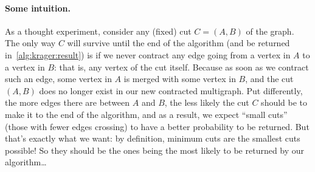 \paragraph{Some intuition.} As a thought experiment, consider any (fixed) cut $C=(A,B)$ of the graph. The only way $C$ will survive until the end of the algorithm (and be returned in~\cref{alg:krager:result}) is if we never contract any edge going from a vertex in $A$ to a vertex in $B$: that is, any vertex of the cut itself. Because as soon as we contract such an edge, some vertex in $A$ is merged with some vertex in $B$, and the cut $(A,B)$ does no longer exist in our new contracted multigraph. Put differently, the more edges there are between $A$ and $B$, the less likely the cut $C$ should be to make it to the end of the algorithm, and as a result, we expect ``small cuts'' (those with fewer edges crossing) to have a better probability to be returned. But that's exactly what we want: by definition, minimum cuts are the smallest cuts possible! So they should be the ones being the most likely to be returned by our algorithm\dots 

